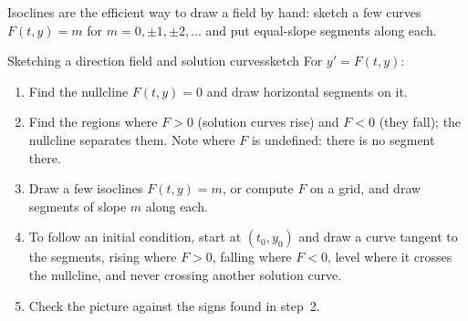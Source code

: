 \documentclass[11pt]{article}
\begin{document}
Isoclines are the efficient way to draw a field by hand: sketch a few curves $F(t,y)=m$ for $m=0,\pm1,\pm2,\dots$ and put equal-slope segments along each.

\begin{proc}{Sketching a direction field and solution curves}{sketch}
For $y'=F(t,y)$:
\begin{enumerate}[nosep]
  \item Find the nullcline $F(t,y)=0$ and draw horizontal segments on it.
  \item Find the regions where $F>0$ (solution curves rise) and $F<0$ (they fall); the nullcline separates them. Note where $F$ is undefined: there is no segment there.
  \item Draw a few isoclines $F(t,y)=m$, or compute $F$ on a grid, and draw segments of slope $m$ along each.
  \item To follow an initial condition, start at $(t_0,y_0)$ and draw a curve tangent to the segments, rising where $F>0$, falling where $F<0$, level where it crosses the nullcline, and never crossing another solution curve.
  \item Check the picture against the signs found in step~2.
\end{enumerate}
\end{proc}
\end{document}
